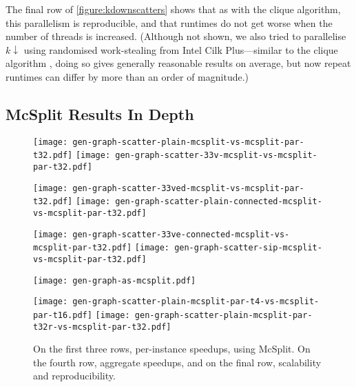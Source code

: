 \documentclass[sigconf]{acmart}
\begin{document}
The final row of \cref{figure:kdownscatters} shows that as with the clique algorithm, this
parallelism is reproducible, and that runtimes do not get worse when the number of threads is
increased. (Although not shown, we also tried to parallelise $k{\downarrow}$ using randomised
work-stealing from Intel Cilk Plus---similar to the clique algorithm
\citep{DBLP:journals/topc/McCreeshP15}, doing so gives generally reasonable results on average, but
now repeat runtimes can differ by more than an order of magnitude.)

\subsection{McSplit Results In Depth}

\begin{figure}[p]
    \texttt{[image: gen-graph-scatter-plain-mcsplit-vs-mcsplit-par-t32.pdf]}
    \hfill
    \texttt{[image: gen-graph-scatter-33v-mcsplit-vs-mcsplit-par-t32.pdf]}

    \vspace*{0.2em}

    \texttt{[image: gen-graph-scatter-33ved-mcsplit-vs-mcsplit-par-t32.pdf]}
    \hfill
    \texttt{[image: gen-graph-scatter-plain-connected-mcsplit-vs-mcsplit-par-t32.pdf]}

    \vspace*{0.2em}

    \texttt{[image: gen-graph-scatter-33ve-connected-mcsplit-vs-mcsplit-par-t32.pdf]}
    \hfill
    \texttt{[image: gen-graph-scatter-sip-mcsplit-vs-mcsplit-par-t32.pdf]}

    \vspace*{0.6em}

    \texttt{[image: gen-graph-as-mcsplit.pdf]}

    \vspace*{0.2em}

    \texttt{[image: gen-graph-scatter-plain-mcsplit-par-t4-vs-mcsplit-par-t16.pdf]}
    \hfill
    \texttt{[image: gen-graph-scatter-plain-mcsplit-par-t32r-vs-mcsplit-par-t32.pdf]}

    \caption{On the first three rows, per-instance speedups, using McSplit. On the
    fourth row, aggregate speedups, and on the final row, scalability and
    reproducibility.}\label{figure:mcsplitscatter}
\end{figure}
\end{document}
